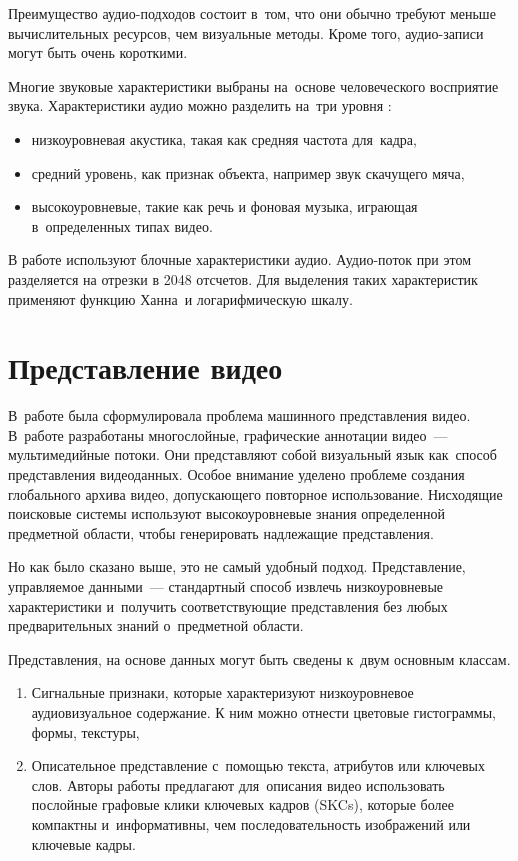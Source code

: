 Преимущество аудио-подходов состоит в~том,
что они обычно требуют меньше вычислительных ресурсов, чем визуальные методы.
Кроме того, аудио-записи могут быть очень короткими.

Многие звуковые характеристики выбраны на~основе человеческого восприятие звука.
Характеристики аудио можно разделить на~три уровня \cite{Chen:2008}:
\begin{itemize}
    \item низкоуровневая акустика, такая как средняя частота для~кадра,
    \item средний уровень, как признак объекта, например звук скачущего мяча,
    \item высокоуровневые, такие как речь и фоновая музыка,
        играющая в~определенных типах видео.
\end{itemize}


В работе \cite{Seyerlehner:2010} используют блочные характеристики аудио.
Аудио-поток при этом разделяется на отрезки в 2048 отсчетов.
Для выделения таких характеристик применяют функцию Ханна\
и логарифмическую шкалу.



\section{Представление видео}


В~работе \cite{Haase:95} была сформулировала проблема
машинного представления видео.
В~работе \cite{Chih-Wen:2007} разработаны многослойные,
графические аннотации видео~— мультимедийные
потоки.
Они представляют собой визуальный язык
как~способ представления видеоданных. Особое внимание уделено
проблеме создания глобального архива видео,
допускающего повторное использование.
Нисходящие поисковые системы используют высокоуровневые знания определенной
предметной области, чтобы генерировать надлежащие представления.

Но как было сказано выше, это не самый удобный подход.
Представление, управляемое данными~— стандартный способ извлечь
низкоуровневые характеристики и~получить соответствующие представления
без любых предварительных знаний о~предметной области.

Представления, на основе данных могут быть сведены к~двум основным классам.
\begin{enumerate}
    \item Сигнальные признаки, которые характеризуют низкоуровневое
        аудиовизуальное содержание. К ним можно отнести
        цветовые гистограммы, формы, текстуры,
    \item Описательное представление с~помощью текста, атрибутов или ключевых слов.
        Авторы работы \cite{Xiangang:2011} предлагают для~описания
        видео использовать послойные графовые клики ключевых кадров
        (SKCs\index{SKC}), которые более компактны и~информативны,
        чем последовательность изображений или ключевые кадры.
\end{enumerate}



